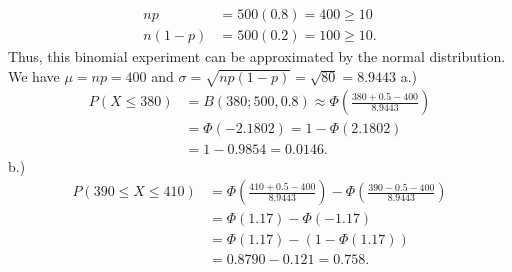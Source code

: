 \documentclass{report}
\begin{document}
\begin{align*}
    np &= 500(0.8) = 400 \geq 10 \\
    n(1-p) &= 500(0.2) = 100 \geq 10
.\end{align*}
\bigbreak \noindent 
Thus, this binomial experiment can be approximated by the normal distribution. We have $\mu = np = 400$ and $\sigma = \sqrt{np(1-p)} = \sqrt{80} = 8.9443$
\bigbreak \noindent 
a.)
\begin{align*}
    P(X \leq 380) &= B(380; 500, 0.8) \approx \Phi\left(\frac{380 + 0.5 - 400}{8.9443}\right) \\
    &=\Phi\left(-2.1802\right) = 1-\Phi(2.1802) \\
    &=1-0.9854 = 0.0146
.\end{align*}
\bigbreak \noindent 
b.) 
\begin{align*}
    P(390 \leq X \leq 410) &= \Phi\left(\frac{410 + 0.5 - 400}{8.9443}\right) - \Phi\left(\frac{390 - 0.5 -400}{8.9443}\right) \\
                           &=\Phi(1.17) - \Phi(-1.17) \\
                           &=\Phi(1.17) - (1-\Phi(1.17)) \\
                           &=0.8790 - 0.121 = 0.758
.\end{align*}
\end{document}
